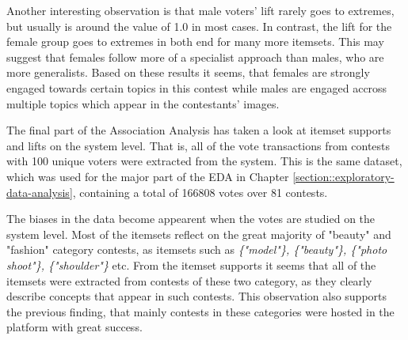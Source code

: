 Another interesting observation is that male voters' lift rarely goes to extremes, but usually is around the value of 1.0 in most cases. In contrast, the lift for the female group goes to extremes in both end for many more itemsets. This may suggest that females follow more of a specialist approach than males, who are more generalists. Based on these results it seems, that females are strongly engaged towards certain topics in this contest while males are engaged accross multiple topics which appear in the contestants' images.



The final part of the Association Analysis has taken a look at itemset supports and lifts on the system level. That is, all of the vote transactions from contests with 100 unique voters were extracted from the system. This is the same dataset, which was used for the major part of the EDA in Chapter \ref{section::exploratory-data-analysis}, containing a total of 166808 votes over 81 contests. 

The biases in the data become appearent when the votes are studied on the system level. Most of the itemsets reflect on the great majority of "beauty" and "fashion" category contests, as itemsets such as \emph{\{"model"\}, \{"beauty"\}, \{"photo shoot"\}, \{"shoulder"\}} etc. From the itemset supports it seems that all of the itemsets were extracted from contests of these two category, as they clearly describe concepts that appear in such contests. This observation also supports the previous finding, that mainly contests in these categories were hosted in the platform with great success.

